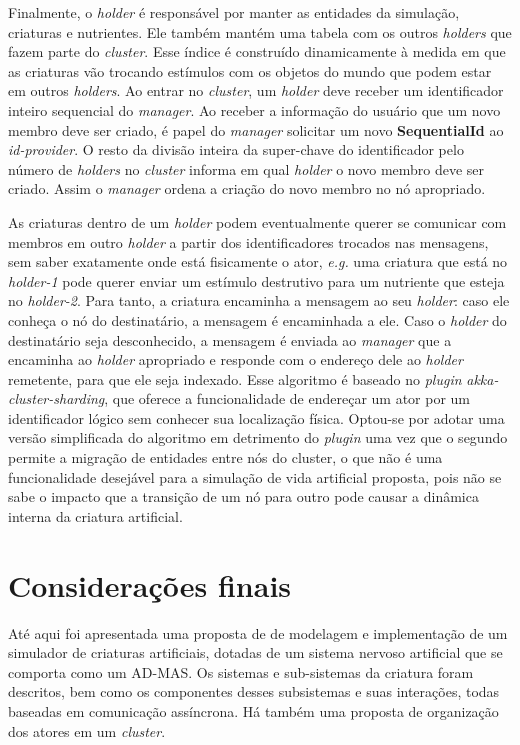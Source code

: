 Finalmente, o \textit{holder} é responsável por manter as entidades da simulação, criaturas e nutrientes. Ele também mantém uma tabela com os outros \textit{holders} que fazem parte do \textit{cluster}. Esse índice é construído dinamicamente à medida em que as criaturas vão trocando estímulos com os objetos do mundo que podem estar em outros \textit{holders}. Ao entrar no \textit{cluster}, um \textit{holder} deve receber um identificador inteiro sequencial do \textit{manager}. Ao receber a informação do usuário que um novo membro deve ser criado, é papel do \textit{manager} solicitar um novo \textbf{SequentialId} ao \textit{id-provider}. O resto da divisão inteira da super-chave do identificador pelo número de \textit{holders} no \textit{cluster} informa em qual \textit{holder} o novo membro deve ser criado. Assim o \textit{manager} ordena a criação do novo membro no nó apropriado. 

As criaturas dentro de um \textit{holder} podem eventualmente querer se comunicar com membros em outro \textit{holder} a partir dos identificadores trocados nas mensagens, sem saber exatamente onde está fisicamente o ator, \textit{e.g.} uma criatura que está no \textit{holder-1} pode querer enviar um estímulo destrutivo para um nutriente que esteja no \textit{holder-2}. Para tanto, a criatura encaminha a mensagem ao seu \textit{holder}: caso ele conheça o nó do destinatário, a mensagem é encaminhada a ele. Caso o \textit{holder} do destinatário seja desconhecido, a mensagem é enviada ao \textit{manager} que a encaminha ao \textit{holder} apropriado e responde com o endereço dele ao \textit{holder} remetente, para  que ele seja indexado. Esse algoritmo é baseado no \textit{plugin} \textit{akka-cluster-sharding}, que oferece a funcionalidade de endereçar um ator por um identificador lógico sem conhecer sua localização física. Optou-se por adotar uma versão simplificada do algoritmo em detrimento do \textit{plugin} uma vez que o segundo permite a migração de entidades entre nós do cluster, o que não é uma funcionalidade desejável para a simulação de vida artificial proposta, pois não se sabe o impacto que a transição de um nó para outro pode causar a dinâmica interna da criatura artificial.

\section{Considerações finais}

Até aqui foi apresentada uma proposta de de modelagem e implementação de um simulador de criaturas artificiais, dotadas de um sistema nervoso artificial que se comporta como um AD-MAS. Os sistemas e sub-sistemas da criatura foram descritos, bem como os componentes desses subsistemas e suas interações, todas baseadas em comunicação assíncrona. Há também uma proposta de organização dos atores em um \textit{cluster}. 

